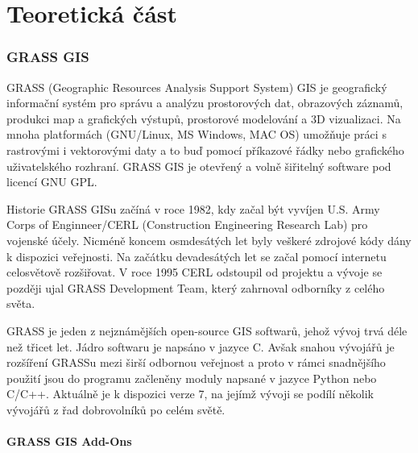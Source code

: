 \documentclass[12pt,a4paper]{article}
\begin{document}
\newpage
\part{Teoretická část}

\newpage
\section{GRASS GIS}

GRASS (Geographic Resources Analysis Support System)
GIS je geografický informační systém
pro správu a analýzu prostorových dat, obrazových záznamů, produkci
map a grafických výstupů, prostorové modelování a 3D vizualizaci. Na
mnoha platformách (GNU/Linux, MS Windows, MAC OS) umožňuje práci s
rastrovými i vektorovými daty a to buď pomocí příkazové řádky nebo
grafického uživatelského rozhraní. GRASS GIS je otevřený a volně
šiřitelný software pod licencí GNU GPL.

Historie\cite{rukovet} GRASS GISu začíná v roce 1982, kdy začal být
vyvíjen U.S. Army Corps of Enginneer/CERL (Construction Engineering
Research Lab) pro vojenské účely. Nicméně koncem osmdesátých let byly
veškeré zdrojové kódy dány k dispozici veřejnosti. Na začátku
devadesátých let se začal pomocí internetu celosvětově rozšiřovat. V
roce 1995 CERL odstoupil od projektu a vývoje se později ujal GRASS
Development Team, který zahrnoval odborníky z celého světa.

GRASS je jeden z nejznámějších open-source GIS softwarů, jehož vývoj
trvá déle než třicet let. Jádro softwaru je napsáno v jazyce C. Avšak
snahou vývojářů je rozšíření GRASSu mezi širší odbornou veřejnost a
proto v rámci snadnějšího použití jsou do programu začleněny moduly
napsané v jazyce Python nebo C/C++. Aktuálně je k dispozici verze 7, na
jejímž vývoji se podílí několik vývojářů z řad dobrovolníků po celém
světě.

\subsection{GRASS GIS Add-Ons}
\end{document}
